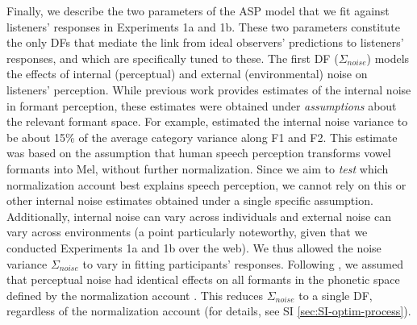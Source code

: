 \documentclass[preprint]{JASA}
\begin{document}
Finally, we describe the two parameters of the ASP model that we fit against listeners' responses in Experiments 1a and 1b. These two parameters constitute the only DFs that mediate the link from ideal observers' predictions to listeners' responses, and which are specifically tuned to these. The first DF (\(\Sigma_{noise}\)) models the effects of internal (perceptual) and external (environmental) noise on listeners' perception. While previous work provides estimates of the internal noise in formant perception, these estimates were obtained under \emph{assumptions} about the relevant formant space. For example, \citet{feldman2009} estimated the internal noise variance to be about 15\% of the average category variance along F1 and F2. This estimate was based on the assumption that human speech perception transforms vowel formants into Mel, without further normalization. Since we aim to \emph{test} which normalization account best explains speech perception, we cannot rely on this or other internal noise estimates obtained under a single specific assumption. Additionally, internal noise can vary across individuals and external noise can vary across environments (a point particularly noteworthy, given that we conducted Experiments 1a and 1b over the web). We thus allowed the noise variance \(\Sigma_{noise}\) to vary in fitting participants' responses. Following \citet{feldman2009}, we assumed that perceptual noise had identical effects on all formants in the phonetic space defined by the normalization account \citep[see also][]{kronrod2016}. This reduces \(\Sigma_{noise}\) to a single DF, regardless of the normalization account (for details, see SI \ref{sec:SI-optim-process}).
\end{document}
